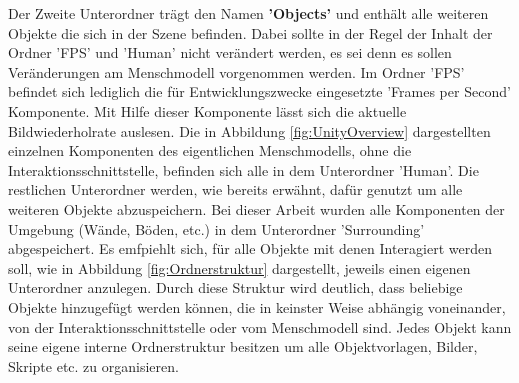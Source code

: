 Der Zweite Unterordner trägt den Namen \textbf{'Objects'} und enthält alle weiteren Objekte die sich in der Szene befinden. Dabei sollte in der Regel der Inhalt der Ordner 'FPS' und 'Human' nicht verändert werden, es sei denn es sollen Veränderungen am Menschmodell vorgenommen werden. Im Ordner 'FPS' befindet sich lediglich die für Entwicklungszwecke eingesetzte 'Frames per Second' Komponente. Mit Hilfe dieser Komponente lässt sich die aktuelle Bildwiederholrate auslesen. Die in Abbildung \ref{fig:UnityOverview} dargestellten einzelnen Komponenten des eigentlichen Menschmodells, ohne die Interaktionsschnittstelle, befinden sich alle in dem Unterordner 'Human'. Die restlichen Unterordner werden, wie bereits erwähnt, dafür genutzt um alle weiteren Objekte abzuspeichern. Bei dieser Arbeit wurden alle Komponenten der Umgebung (Wände, Böden, etc.) in dem Unterordner 'Surrounding' abgespeichert. Es emfpiehlt sich, für alle Objekte mit denen Interagiert werden soll, wie in Abbildung \ref{fig:Ordnerstruktur} dargestellt, jeweils einen eigenen Unterordner anzulegen. Durch diese Struktur wird deutlich, dass beliebige Objekte hinzugefügt werden können, die in keinster Weise abhängig voneinander, von der Interaktionsschnittstelle oder vom Menschmodell sind. Jedes Objekt kann seine eigene interne Ordnerstruktur besitzen um alle Objektvorlagen, Bilder, Skripte etc. zu organisieren.
	
